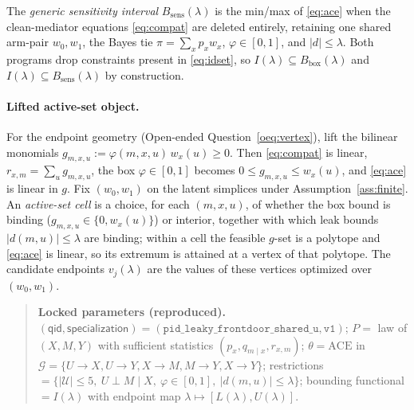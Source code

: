 \documentclass[11pt]{article}
\theoremstyle{definition}
\theoremstyle{plain}
\theoremstyle{remark}
\begin{document}
The \emph{generic sensitivity interval} $B_{\mathrm{sens}}(\lambda)$ is the min/max of \eqref{eq:ace}
when the clean-mediator equations \eqref{eq:compat} are deleted entirely, retaining one shared arm-pair
$w_0,w_1$, the Bayes tie $\pi=\sum_x p_x w_x$, $\varphi\in[0,1]$, and $|d|\le\lambda$. Both programs drop
constraints present in \eqref{eq:idset}, so $I(\lambda)\subseteq B_{\mathrm{box}}(\lambda)$ and
$I(\lambda)\subseteq B_{\mathrm{sens}}(\lambda)$ by construction.

\paragraph{Lifted active-set object.} For the endpoint geometry (Open-ended
Question~\ref{oeq:vertex}), lift the bilinear monomials $g_{m,x,u}:=\varphi(m,x,u)\,w_x(u)\ge0$. Then
\eqref{eq:compat} is linear, $r_{x,m}=\sum_u g_{m,x,u}$, the box $\varphi\in[0,1]$ becomes
$0\le g_{m,x,u}\le w_x(u)$, and \eqref{eq:ace} is linear in $g$. Fix $(w_0,w_1)$ on the latent simplices
under Assumption~\ref{ass:finite}. An \emph{active-set cell} is a choice, for each $(m,x,u)$, of whether
the box bound is binding ($g_{m,x,u}\in\{0,w_x(u)\}$) or interior, together with which leak bounds
$|d(m,u)|\le\lambda$ are binding; within a cell the feasible $g$-set is a polytope and \eqref{eq:ace} is
linear, so its extremum is attained at a vertex of that polytope. The candidate endpoints $v_j(\lambda)$
are the values of these vertices optimized over $(w_0,w_1)$.

\begin{quote}\small\textbf{Locked parameters (reproduced).}
$(\textsf{qid},\textsf{specialization})=(\texttt{pid\_leaky\_frontdoor\_shared\_u},\texttt{v1})$;
$P=$ law of $(X,M,Y)$ with sufficient statistics $(p_x,q_{m\mid x},r_{x,m})$;
$\theta=\mathrm{ACE}$ in $\mathcal G=\{U\to X,U\to Y,X\to M,M\to Y,X\to Y\}$;
restrictions $=\{|\mathcal U|\le5,\ U\perp M\mid X,\ \varphi\in[0,1],\ |d(m,u)|\le\lambda\}$;
bounding functional $=I(\lambda)$ with endpoint map $\lambda\mapsto[L(\lambda),U(\lambda)]$.
\end{quote}
\end{document}
